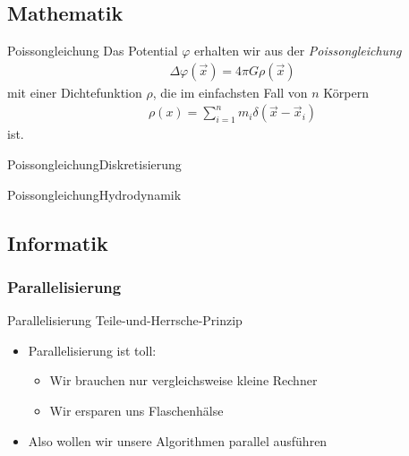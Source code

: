 \documentclass{beamer}
\begin{document}
\subsection{Mathematik}
\begin{frame}{Poissongleichung}
  Das Potential $\varphi$ erhalten wir aus der \emph{Poissongleichung}
  \begin{align}
    \Delta \varphi(\vec{x}) = 4\pi G \rho(\vec{x})
  \end{align}
  mit einer Dichtefunktion $\rho$, die im einfachsten Fall von $n$ Körpern
  \begin{align}
    \rho(x) = \sum_{i=1}^n m_i \delta(\vec{x} - \vec{x}_i)
  \end{align}
  ist.
\end{frame}
\begin{frame}{Poissongleichung}{Diskretisierung}
\end{frame}
\begin{frame}{Poissongleichung}{Hydrodynamik}
\end{frame}

\begin{frame}
  
\end{frame}

\subsection{Informatik}
\subsubsection*{Parallelisierung}
\begin{frame}{Parallelisierung}
  Teile-und-Herrsche-Prinzip
\end{frame}
\begin{frame}
  \begin{itemize}
    \item Parallelisierung ist toll:
      \begin{itemize}
        \item Wir brauchen nur vergleichsweise kleine Rechner
        \item Wir ersparen uns Flaschenhälse
      \end{itemize}
    \item Also wollen wir unsere Algorithmen parallel ausführen
  \end{itemize}
\end{frame}
\end{document}
